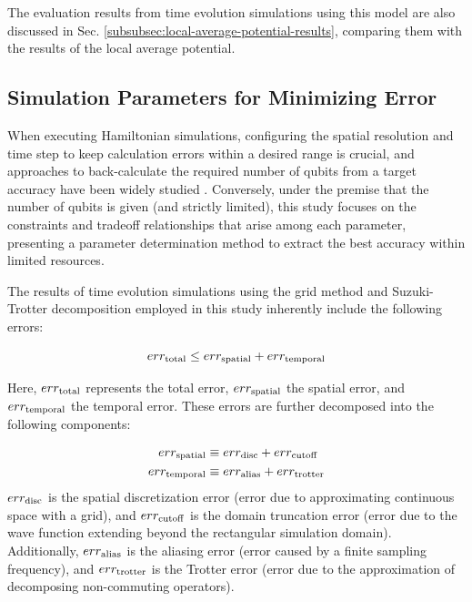 \documentclass[report_2025.tex]{subfiles}
\begin{document}
The evaluation results from time evolution simulations using this model are also
discussed in Sec. \ref{subsubsec:local-average-potential-results}, comparing
them with the results of the local average potential.

\subsection{Simulation Parameters for Minimizing Error}
\label{sec:parameter-selection-for-minimum-error}

When executing Hamiltonian simulations, configuring the spatial resolution and
time step to keep calculation errors within a desired range is crucial, and
approaches to back-calculate the required number of qubits from a target
accuracy have been widely studied \cite{FEIT1982412, Kivlichan_2017,
Chan2023.sciadv.abo7484}. Conversely, under the premise that the number of
qubits is given (and strictly limited), this study focuses on the constraints
and tradeoff relationships that arise among each parameter, presenting a
parameter determination method to extract the best accuracy within limited
resources.

The results of time evolution simulations using the grid method and
Suzuki-Trotter decomposition employed in this study inherently include the
following errors:

\begin{equation}
err_{\mathrm{total}} \leq err_{\mathrm{spatial}} + err_{\mathrm{temporal}}
\label{eq:error-total-decomposition}
\end{equation}

Here, $err_{\mathrm{total}}$ represents the total error, $err_{\mathrm{spatial}}$ the spatial error,
and $err_{\mathrm{temporal}}$ the temporal error. These errors are further decomposed into
the following components:

\begin{align}
    err_{\mathrm{spatial}} &\equiv err_{\mathrm{disc}} + err_{\mathrm{cutoff}} \\
    err_{\mathrm{temporal}} &\equiv err_{\mathrm{alias}} + err_{\mathrm{trotter}}
\end{align}
$err_{\mathrm{disc}}$ is the spatial discretization error (error due to approximating
continuous space with a grid), and $err_{\mathrm{cutoff}}$ is the domain truncation error
(error due to the wave function extending beyond the rectangular simulation
domain). Additionally, $err_{\mathrm{alias}}$ is the aliasing error (error caused by a
finite sampling frequency), and $err_{\mathrm{trotter}}$ is the Trotter error (error due to
the approximation of decomposing non-commuting operators).
\end{document}
